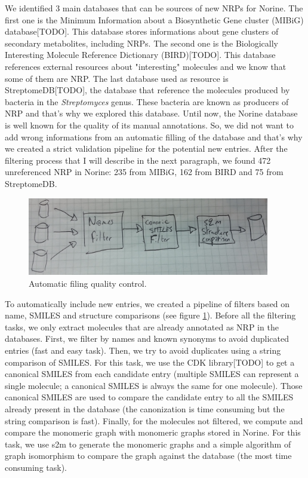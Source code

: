 \documentclass[long, final]{jobim2017}
\begin{document}
We identified 3 main databases that can be sources of new NRPs for Norine.
The first one is the Minimum Information about a Biosynthetic Gene cluster (MIBiG) database[TODO].
This database stores informations about gene clusters of secondary metabolites, including NRPs.
The second one is the Biologically Interesting Molecule Reference Dictionary (BIRD)[TODO].
This database references external resources about "interesting" molecules and we know that some of them are NRP.
The last database used as resource is StreptomeDB[TODO], the database that reference the molecules produced by bacteria in the \textit{Streptomyces} genus.
These bacteria are known as producers of NRP and that's why we explored this database.
Until now, the Norine database is well known for the quality of its manual annotations.
So, we did not want to add wrong informations from an automatic filling of the database and that's why we created a strict validation pipeline for the potential new entries.
After the filtering process that I will describe in the next paragraph, we found 472 unreferenced NRP in Norine: 235 from MIBiG, 162 from BIRD and 75 from StreptomeDB.

 \begin{figure}
   \begin{center}
     \includegraphics[width=400px]{figs/filters.jpg}
   \end{center}
   \caption{Automatic filing quality control.}
   \label{fig:quality}
 \end{figure}

To automatically include new entries, we created a pipeline of filters based on name, SMILES and structure comparisons (see figure \ref{fig:quality}).
Before all the filtering tasks, we only extract molecules that are already annotated as NRP in the databases.
First, we filter by names and known synonyms to avoid duplicated entries (fast and easy task).
Then, we try to avoid duplicates using a string comparison of SMILES.
For this task, we use the CDK library[TODO] to get a canonical SMILES from each candidate entry (multiple SMILES can represent a single molecule; a canonical SMILES is always the same for one molecule).
Those canonical SMILES are used to compare the candidate entry to all the SMILES already present in the database (the canonization is time consuming but the string comparison is fast).
Finally, for the molecules not filtered, we compute and compare the monomeric graph with monomeric graphs stored in Norine.
For this task, we use s2m to generate the monomeric graphs and a simple algorithm of graph isomorphism to compare the graph against the database (the most time consuming task).
\end{document}
